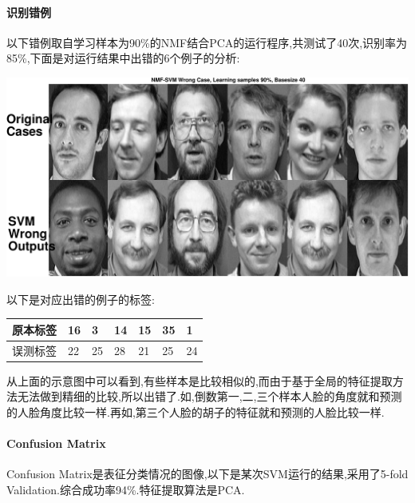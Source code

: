 	\paragraph{识别错例}
	以下错例取自学习样本为90\%的NMF结合PCA的运行程序,共测试了40次,识别率为85\%,下面是对运行结果中出错的6个例子的分析:
	\begin{center}
	\begin{minipage}[t]{\linewidth}
	\center
	{
	\includegraphics[width=\textwidth]{Img/svm_wrong} 
	}
	\end{minipage}
	\medskip
	\end{center}
	以下是对应出错的例子的标签:
	\begin{center}
	\begin{tabular}{|l|l|l|l|l|l|l|}
\hline
原本标签&16&3&14&15&35&1\\\hline
误测标签&22&25&28&21&25&24\\\hline
\end{tabular}
\end{center}

	
	从上面的示意图中可以看到,有些样本是比较相似的,而由于基于全局的特征提取方法无法做到精细的比较,所以出错了.如,倒数第一,二,三个样本人脸的角度就和预测的人脸角度比较一样.再如,第三个人脸的胡子的特征就和预测的人脸比较一样.
	
\paragraph{Confusion Matrix}

Confusion Matrix是表征分类情况的图像,以下是某次SVM运行的结果,采用了5-fold Validation.综合成功率94\%.特征提取算法是PCA.

